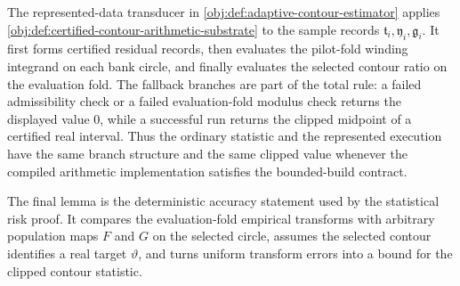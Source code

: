 The represented-data transducer in \cref{obj:def:adaptive-contour-estimator} applies \cref{obj:def:certified-contour-arithmetic-substrate} to the sample records \(\mathfrak t_i,\mathfrak y_i,\mathfrak g_i\). It first forms certified residual records, then evaluates the pilot-fold winding integrand on each bank circle, and finally evaluates the selected contour ratio on the evaluation fold. The fallback branches are part of the total rule: a failed admissibility check or a failed evaluation-fold modulus check returns the displayed value \(0\), while a successful run returns the clipped midpoint of a certified real interval. Thus the ordinary statistic and the represented execution have the same branch structure and the same clipped value whenever the compiled arithmetic implementation satisfies the bounded-build contract.

The final lemma is the deterministic accuracy statement used by the statistical risk proof. It compares the evaluation-fold empirical transforms with arbitrary population maps \(F\) and \(G\) on the selected circle, assumes the selected contour identifies a real target \(\vartheta\), and turns uniform transform errors into a bound for the clipped contour statistic.

